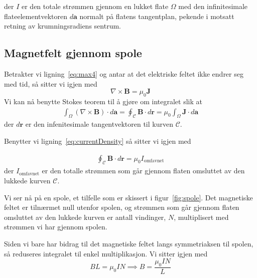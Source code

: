 \documentclass[a4paper,11pt, twocolumn]{article}
\begin{document}
der $I$ er den totale strømmen gjennom en lukket flate $\Omega$ med den infinitesimale flateelementvektoren $d\mathbf{a}$ normalt på flatens tangentplan, pekende i motsatt retning av krumningsradiens sentrum. 
\subsection{Magnetfelt gjennom spole}
Betrakter vi ligning~\eqref{eq:max4} og antar at det elektriske feltet ikke endrer seg med tid, så sitter vi igjen med 
\begin{equation}
	\nabla\times\mathbf{B} = \mu_0\mathbf{J}
	\label{eq:independentOfTime}
\end{equation}
Vi kan nå benytte Stokes teorem til å gjøre om integralet slik at
\begin{align}
	\int_\Omega (\nabla\times\mathbf{B})\cdot d\mathbf{a} = \oint_\mathcal{C}\mathbf{B}\cdot d\mathbf{r}=\mu_0\int_\Omega \mathbf{J} \cdot d\mathbf{a} 
 	\label{}
\end{align}
der $d\mathbf{r}$ er den infenitesimale tangentvektoren til kurven $\mathcal{C}$. 

Benytter vi ligning~\eqref{eq:currentDensity} så sitter vi igjen med 

\begin{align}
	\oint_\mathcal{C}\mathbf{B}\cdot d\mathbf{r}=\mu_0 I_\text{omfavnet}
	\label{eq:etterStokes}
\end{align}
der $I_\text{omfavnet}$ er den totalle strømmen som går gjennom flaten omsluttet av den lukkede kurven $\mathcal{C}$.

Vi ser nå på en spole, et tilfelle som er skissert i figur~\ref{fig:spole}. Det magnetiske feltet er tilnærmet null utenfor spolen, og strømmen som går gjennom flaten omsluttet av den lukkede kurven er antall vindinger, $N$, multiplisert med strømmen vi har gjennom spolen.

Siden vi bare har bidrag til det magnetiske feltet langs symmetriaksen til spolen, så reduseres integralet til enkel multiplikasjon. Vi sitter igjen med
\begin{equation}
	BL = \mu_0IN \implies B = \frac{\mu_0 I N}{L}
	\label{eq:magSpole}
\end{equation}
\end{document}
